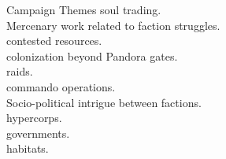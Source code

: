 \begin{tableone}{Campaign Themes}
\textellipsis soul trading.\\
Mercenary work related to faction struggles.\\
\textellipsis contested resources.\\
\textellipsis colonization beyond Pandora gates.\\
\textellipsis raids.\\
\textellipsis commando operations.\\
Socio-political intrigue between factions.\\
\textellipsis hypercorps.\\
\textellipsis governments.\\
\textellipsis habitats.\\
\end{tableone}
